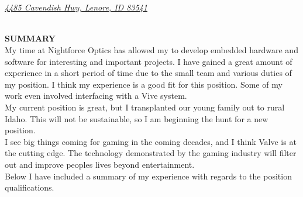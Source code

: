 \documentclass[10pt,letterpaper, table]{article}
\begin{document}
\hspace*{\fill}{\sl (509) 701-9014}	 \vspace{.5pc}\\ 
\hspace*{\fill}{\sl tedfernau@gmail.com} \vspace{.5pc}\\ 
\hspace*{\fill}\href{http://www.mailaletter.com/}{\sc\sl 4485 Cavendish Hwy, Lenore, ID 83541}\vspace{.5pc}\\ 
\hspace*{\fill} {\Large {} \quad {}  \quad {} \quad {} \quad {}}
 \vspace{.5pc}\\ 
\noindent\makebox[\linewidth]{\rule{\linewidth}{0.4pt}}

\vspace*{\fill}
{\noindent\sc\bf SUMMARY}\vspace{.5pc}\\
\indent My time at Nightforce Optics has allowed my to develop embedded hardware and software for interesting and important projects. I have gained a great amount of experience in a short period of time due to the small team and various duties of my position. I think my experience is a good fit for this position. Some of my work even involved interfacing with a Vive system. \\

\indent My current position is great, but I transplanted our young family out to rural Idaho. This will not be sustainable, so I am beginning the hunt for a new position. \\

\indent I see big things coming for gaming in the coming decades, and I think Valve is at the cutting edge. The technology demonstrated by the gaming industry will filter out and improve peoples lives beyond entertainment. \\

\indent Below I have included a summary of my experience with regards to the position qualifications.
\end{document}

